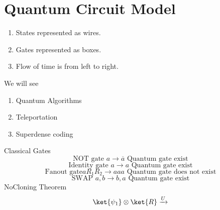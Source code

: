 
\section{Quantum Circuit Model}
\begin{enumerate}
    \item States represented as wires.
    \item Gates represented as boxes. 
    \item Flow of time is from left to right. 
\end{enumerate}
We will see
\begin{enumerate}
    \item Quantum Algorithms
    \item Teleportation
    \item Superdense coding
\end{enumerate}
Classical Gates
\[
   \text{NOT gate } a \to \overline{a} \text{ Quantum gate exist}
\]
\[
    \text{Identity gate } a \to a  \text{ Quantum gate exist}
\]
\[
    \text{Fanout gate} aR_{1}R_2 \to a a a  \text{ Quantum gate does not exist}
\]
\[
    \text{SWAP } a,b \to b,a  \text{ Quantum gate exist}
\]
NoCloning Theorem
\[
    \ket{\psi_1}\otimes\ket{R} \xrightarrow{U}
\]